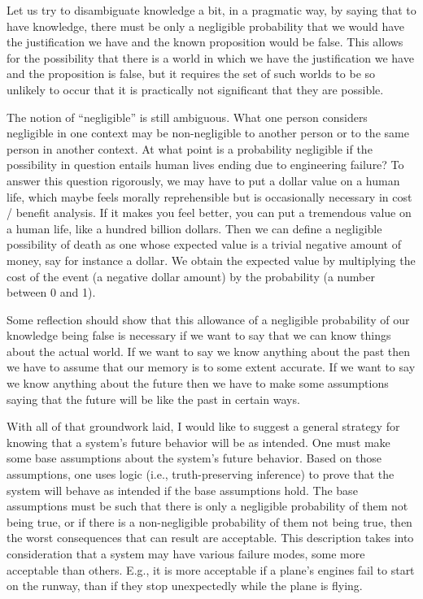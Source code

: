 \documentclass[11pt]{article}
\begin{document}
Let us try to disambiguate knowledge a bit, in a pragmatic way, by saying that to
have knowledge, there must be only a negligible probability that we would have the
justification we have and the known proposition would be false. This allows for the
possibility that there is a world in which we have the justification we have and the
proposition is false, but it requires the set of such worlds to be so unlikely to occur
that it is practically not significant that they are possible.

The notion of ``negligible'' is still ambiguous. What one person considers negligible
in one context may be non-negligible to another person or to the same person in another
context. At what point is a probability negligible if the possibility in question entails
human lives ending due to engineering failure? To answer this question rigorously, we may have
to put a dollar value on a human life, which maybe feels morally reprehensible but
is occasionally necessary in cost / benefit analysis. If it makes you feel better,
you can put a tremendous value on a human life, like a hundred billion dollars.
Then we can define a negligible possibility of death as one whose expected value
is a trivial negative amount of money,
say for instance a dollar. We obtain the expected value by multiplying the cost of the
event (a negative dollar amount) by the probability (a number between 0 and 1).

Some reflection should show that this allowance of a negligible probability
of our knowledge being false is necessary if we want to say that we can know things
about the actual world. If we want to say we know anything about the past then we have
to assume that our memory is to some extent accurate. If we want to say we know anything
about the future then we have to make some assumptions saying that the future will
be like the past in certain ways.

With all of that groundwork laid, I would like to suggest a general strategy for
knowing that a system's future behavior will be as intended. One must make some base
assumptions about the system's future behavior. Based on those assumptions, one uses
logic (i.e., truth-preserving inference) to prove that the system will behave as intended
if the base assumptions hold. The base assumptions must be such that there is only a
negligible probability of them not being true, or if there is a non-negligible probability
of them not being true, then the worst consequences that can result are acceptable.
This description takes into consideration that a system may have various failure modes,
some more acceptable than others. E.g., it is more acceptable if a plane's engines fail
to start on the runway, than if they stop unexpectedly while the plane is flying.
\end{document}
